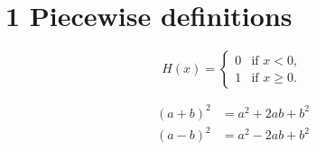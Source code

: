 \documentclass{article}
\begin{document}
\section*{1 Piecewise definitions}

\[
H(x) = \begin{cases} 0 & \text{if } x < 0, \\ 1 & \text{if } x \ge 0. \end{cases}
\]

\begin{align}
(a + b)^2 &= a^2 + 2ab + b^2 \\
(a - b)^2 &= a^2 - 2ab + b^2
\end{align}
\end{document}

